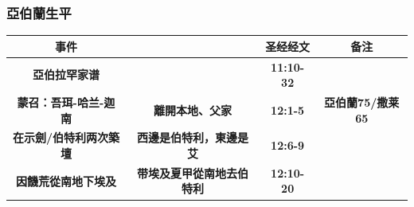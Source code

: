 \subsubsection{亞伯蘭生平}

\begin{table}[H]
\begin{threeparttable}
\begin{tabular}{c c c c}
\toprule
 \multicolumn{1}{L{\dimexpr0.25\linewidth-1\tabcolsep\relax}}{\bfseries 事件} 
&\multicolumn{1}{L{\dimexpr0.2\linewidth-1\tabcolsep\relax}}{\bfseries  }   
&\multicolumn{1}{L{\dimexpr0.1\linewidth-1\tabcolsep\relax}}{\bfseries 圣经经文}     
&\multicolumn{1}{L{\dimexpr0.2\linewidth-1\tabcolsep\relax}}{\bfseries  备注}  \\\hline

\multicolumn{1}{L{\dimexpr0.25\linewidth-1\tabcolsep\relax}}{\bfseries 亞伯拉罕家谱}  
& \multicolumn{1}{L{\dimexpr0.25\linewidth-1\tabcolsep\relax}}{\bfseries  }
& \multicolumn{1}{L{\dimexpr0.1\linewidth-1\tabcolsep\relax}}{\bfseries 11:10-32}
& \multicolumn{1}{L{\dimexpr0.2\linewidth-1\tabcolsep\relax}}{\bfseries  }\\ 

\multicolumn{1}{L{\dimexpr0.25\linewidth-1\tabcolsep\relax}}{\bfseries 蒙召：吾珥-哈兰-迦南} 
& \multicolumn{1}{L{\dimexpr0.25\linewidth-1\tabcolsep\relax}}{\bfseries 離開本地、父家} 
& \multicolumn{1}{L{\dimexpr0.1\linewidth-1\tabcolsep\relax}}{\bfseries 12:1-5}
& \multicolumn{1}{L{\dimexpr0.2\linewidth-1\tabcolsep\relax}}{\bfseries 亞伯蘭75/撒莱65}\\ 

\multicolumn{1}{L{\dimexpr0.25\linewidth-1\tabcolsep\relax}}{\bfseries 在示劍/伯特利两次築壇} 
& \multicolumn{1}{L{\dimexpr0.25\linewidth-1\tabcolsep\relax}}{\bfseries 西邊是伯特利，東邊是艾}  
& \multicolumn{1}{L{\dimexpr0.1\linewidth-1\tabcolsep\relax}}{\bfseries 12:6-9}
& \multicolumn{1}{L{\dimexpr0.2\linewidth-1\tabcolsep\relax}}{\bfseries }\\

\multicolumn{1}{L{\dimexpr0.25\linewidth-1\tabcolsep\relax}}{\bfseries 因饑荒從南地下埃及} 
& \multicolumn{1}{L{\dimexpr0.255\linewidth-1\tabcolsep\relax}}{\bfseries 带埃及夏甲從南地去伯特利}   
& \multicolumn{1}{L{\dimexpr0.1\linewidth-1\tabcolsep\relax}}{\bfseries 12:10-20}
& \multicolumn{1}{L{\dimexpr0.2\linewidth-1\tabcolsep\relax}}{\bfseries }\\


\end{tabular}
\end{threeparttable}
\end{table}
